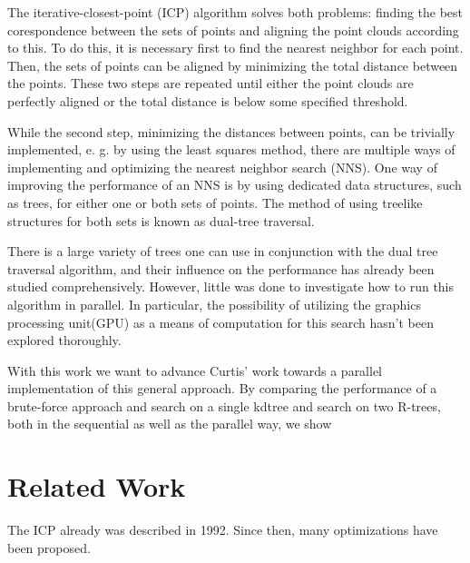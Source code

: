 \documentclass{utue} %
\begin{document}
The iterative-closest-point (ICP) algorithm solves both problems: finding the best corespondence between the sets of points and aligning the point clouds according to this. To do this, it is necessary first to find the nearest neighbor for each point. Then, the sets of points can be aligned by minimizing the total distance between the points. These two steps are repeated until either the point clouds are perfectly aligned or the total distance is below some specified threshold.

While the second step, minimizing the distances between points, can be trivially implemented, e. g. by using the least squares method, there are multiple ways of implementing and optimizing the nearest neighbor search (NNS). One way of improving the performance of an NNS is by using dedicated data structures, such as trees, for either one or both sets of points. The method of using treelike structures for both sets is known as dual-tree traversal.

There is a large variety of trees one can use in conjunction with the dual tree traversal algorithm, and their influence on the performance has already been studied comprehensively. However, little was done to investigate how to run this algorithm in parallel. In particular, the possibility of utilizing the graphics processing unit(GPU) as a means of computation for this search hasn't been explored thoroughly.

With this work we want to advance Curtis' work \cite{improving} towards a parallel implementation of this general approach. By comparing the performance of a brute-force approach and search on a single kdtree and search on two R-trees, both in the sequential as well as the parallel way, we show 
\section{Related Work} 

The ICP already was described in 1992. Since then, many optimizations have been proposed.
\end{document}
